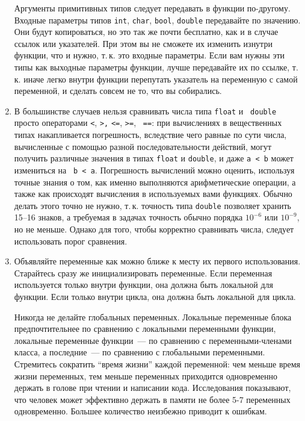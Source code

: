 \documentclass[a4paper,10pt]{article}
\begin{document}
\begin{enumerate}
        Аргументы примитивных типов следует передавать в функции по-другому.
        Входные параметры типов {\tt int}, {\tt char}, {\tt bool}, {\tt double}
        передавайте по значению.  Они будут копироваться, но это так же почти
        бесплатно, как и в случае ссылок или указателей. При этом вы не сможете
        их изменить изнутри функции, что и нужно, т.\,к. это входные параметры.
        Если вам нужны эти типы как выходные параметры функции, лучше
        передавайте их по ссылке, т.\,к.  иначе легко внутри функции перепутать
        указатель на переменную с самой переменной, и сделать совсем не то, что
        вы собирались. 

    \item В большинстве случаев нельзя сравнивать числа типа {\tt float} и {\tt
        double} просто операторами {\tt <}, {\tt >,} {\tt <=}, {\tt >=}, {\tt
        ==}: при вычислениях в вещественных типах накапливается погрешность,
        вследствие чего равные по сути числа, вычисленные с помощью разной
        последовательности действий, могут получить различные значения в типах
        {\tt float} и {\tt double}, и даже {\tt a < b} может измениться на {\tt
        b < a}. Погрешность вычислений можно оценить, используя точные знания о
        том, как именно выполняются арифметические операции, а также как
        происходят вычисления в используемых вами функциях. Обычно делать этого
        точно не нужно, т.\,к. точность типа {\tt double} позволяет хранить 15--16
        знаков, а требуемая в задачах точность обычно порядка $10^{-6}$ или
        $10^{-9}$, но не меньше. Однако для того, чтобы корректно сравнивать
        числа, следует использовать порог сравнения.

    \item Объявляйте переменные как можно ближе к месту их первого
        использования. Старайтесь сразу же инициализировать переменные. Если
        переменная используется только внутри функции, она должна быть локальной
        для функции. Если только внутри цикла, она должна быть локальной для
        цикла. 

        Никогда не делайте глобальных переменных. Локальные переменные блока
        предпочтительнее по сравнению с локальными переменными функции,
        локальные переменные функции~— по сравнению с переменными-членами
        класса, а последние~— по сравнению с глобальными переменными. Стремитесь
        сократить “время жизни” каждой переменной: чем меньше время жизни
        переменных, тем меньше переменных приходится одновременно держать в
        голове при чтении и написании кода. Исследования показывают, что человек
        может эффективно держать в памяти не более 5-7 переменных одновременно.
        Большее количество неизбежно приводит к ошибкам.


\end{enumerate}
\end{document}
